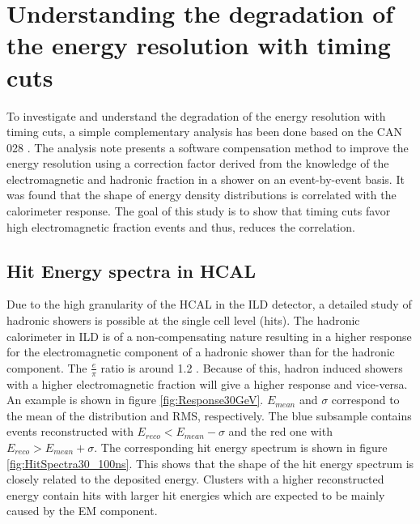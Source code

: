 \section{Understanding the degradation of the energy resolution with timing cuts}
\label{sec:eresdegrad}

To investigate and understand the degradation of the energy resolution with timing cuts, a simple complementary analysis has been done based on the CAN 028 \cite{CaN028}. The analysis note presents a software compensation method to improve the energy resolution using a correction factor derived from the knowledge of the electromagnetic and hadronic fraction in a shower on an event-by-event basis. It was found that the shape of energy density distributions is correlated with the calorimeter response. The goal of this study is to show that timing cuts favor high electromagnetic fraction events and thus, reduces the correlation.

\subsection{Hit Energy spectra in HCAL}

Due to the high granularity of the HCAL in the ILD detector, a detailed study of hadronic showers is possible at the single cell level (hits). The hadronic calorimeter in ILD is of a non-compensating nature resulting in a higher response for the electromagnetic component of a hadronic shower than for the hadronic component. The $\frac{e}{\pi}$ ratio is around 1.2 \cite{ILC_TDR_Vol4}. Because of this, hadron induced showers with a higher electromagnetic fraction will give a higher response and vice-versa. An example is shown in figure \ref{fig:Response30GeV}. $E_{mean}$ and $\sigma$ correspond to the mean of the distribution and RMS, respectively. The blue subsample contains events reconstructed with $E_{reco} < E_{mean} - \sigma$ and the red one with $E_{reco} > E_{mean} + \sigma$. The corresponding hit energy spectrum is shown in figure \ref{fig:HitSpectra30_100ns}. This shows that the shape of the hit energy spectrum is closely related to the deposited energy. Clusters with a higher reconstructed energy contain hits with larger hit energies which are expected to be mainly caused by the EM component.

